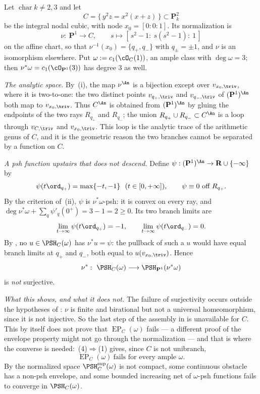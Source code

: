 \begin{example}
\label{ex:ch45-node-computed}
Let $\operatorname{char}k\ne2,3$ and let
\[
 C=\{\,y^2z=x^2(x+z)\,\}\subset\mathbf P^2_k
\]
be the integral nodal cubic, with node $x_0=[0:0:1]$.  Its normalization is
\[
 \nu:\ \mathbf P^1\longrightarrow C,
 \qquad
 s\longmapsto[\,s^2-1:\ s(s^2-1):\ 1\,]
\]
on the affine chart, so that $\nu^{-1}(x_0)=\{q_+,q_-\}$ with
$q_\pm=\pm1$, and $\nu$ is an isomorphism elsewhere.  Put
$\omega:=c_1(\cO_C(1))$, an ample class with $\deg\omega=3$; then
$\nu^*\omega=c_1(\cO_{\mathbf P^1}(3))$ has degree $3$ as well.

\emph{The analytic space.}  By \,(i), the
map $\nu^{\An}$ is a bijection except over $v_{x_0,\triv}$, where it is
two-to-one: the two distinct points $v_{q_+,\triv}$ and $v_{q_-,\triv}$
of $(\mathbf P^1)^{\An}$ both map to $v_{x_0,\triv}$.  Thus $C^{\An}$
is obtained from $(\mathbf P^1)^{\An}$ by gluing the endpoints of the two
rays $R_{q_+}$ and $R_{q_-}$; the union
$R_{q_+}\cup R_{q_-}\subset C^{\An}$ is a loop through $v_{C,\triv}$
and $v_{x_0,\triv}$.  This loop is the analytic trace of the arithmetic
genus of $C$, and it is the geometric reason the two branches cannot be
separated by a function on $C$.

\emph{A psh function upstairs that does not descend.}  Define
$\psi:(\mathbf P^1)^{\An}\to\mathbf R\cup\{-\infty\}$ by
\[
 \psi(t\ord_{q_+})=\max\{-t,-1\}\ \ (t\in[0,+\infty]),
 \qquad
 \psi\equiv0\ \text{off }R_{q_+} .
\]
By the criterion of \,(ii), $\psi$ is
$\nu^*\omega$-psh: it is convex on every ray, and
$\deg\nu^*\omega+\sum_q\psi'_q(0^+)=3-1=2\ge0$.  Its two branch limits are
\[
 \lim_{t\to\infty}\psi(t\ord_{q_+})=-1,
 \qquad
 \lim_{t\to\infty}\psi(t\ord_{q_-})=0 .
\]
By , no $u\in\PSH_C(\omega)$ has
$\nu^*u=\psi$: the pullback of such a $u$ would have equal branch limits
at $q_+$ and $q_-$, both equal to $u(v_{x_0,\triv})$.  Hence
\[
 \nu^*:\ \PSH_C(\omega)\longrightarrow\PSH_{\mathbf P^1}(\nu^*\omega)
\]
is \emph{not} surjective.

\emph{What this shows, and what it does not.}  The failure of surjectivity
occurs outside the hypotheses of
: $\nu$ is finite and birational but not a
universal homeomorphism, since it is not injective.  So the last step of the
assembly in  is unavailable for $C$.  This by
itself does not prove that $\operatorname{EP}_C(\omega)$ fails --- a
different proof of the envelope property might not go through the
normalization --- and that is where the converse is needed:
\,(4)$\Rightarrow$(1)
gives, since $C$ is not unibranch,
\[
 \operatorname{EP}_C(\omega)\ \text{fails for every ample }\omega .
\]
By  the normalized space
$\PSH^{\sup}_C(\omega)$ is not compact, some continuous obstacle has a
non-psh envelope, and some bounded increasing net of $\omega$-psh
functions fails to converge in $\PSH_C(\omega)$.
\end{example}

